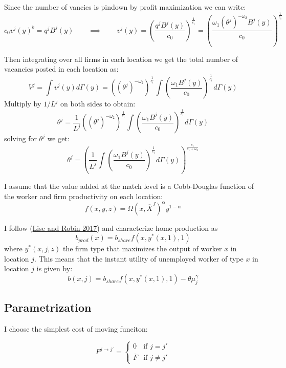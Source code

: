 \documentclass[
  letterpaper,
  DIV=11,
  numbers=noendperiod]{scrreprt}
\begin{document}
Since the number of vancies is pindown by profit maximization we can
write:
\[c_0 v^{j}(y)^{b} = q^j B^j(y) \qquad \implies \qquad  v^{j}(y) = \left(\frac{q^j B^j(y)}{c_0}\right)^{\frac{1}{c_1}} = \left(\frac{\omega_1(\theta^j)^{-\omega_2} B^j(y)}{c_0}\right)^{\frac{1}{c_1}} \]

Then integrating over all firms in each location we get the total number
of vacancies posted in each location as:
\[V^j = \int v^j(y)d\Gamma(y) = \left((\theta^j)^{-\omega_2}\right)^{\frac{1}{c_1}}\int\left(\frac{\omega_1 B^j(y)}{c_0}\right)^{\frac{1}{c_1}}d\Gamma(y)\]
Multiply by \(1/L^j\) on both sides to obtain:
\[\theta^j = \frac{1}{L^j}\left((\theta^j)^{-\omega_2}\right)^{\frac{1}{c_1}}\int\left(\frac{\omega_1 B^j(y)}{c_0}\right)^{\frac{1}{c_1}}d\Gamma(y)\]
solving for \(\theta^j\) we get:
\[\theta^j = \left(\frac{1}{L^j}\int\left(\frac{\omega_1 B^j(y)}{c_0}\right)^{\frac{1}{c_1}}d\Gamma(y)\right)^{\frac{c_1}{c_1+\omega_2}}\]

I assume that the value added at the match level is a Cobb-Douglas
function of the worker and firm productivity on each location:
\[f(x,y,z) = \Omega\left(x, \overline{X}^J\right)^\alpha y^{1-\alpha}\]

I follow
(\protect\hyperlink{ref-liseMacrodynamicsSortingWorkers2017}{Lise and
Robin 2017}) and characterize home production as
\[b_{prod}(x) = b_{share} f(x,y^*(x,1),1)\] where \(y^*(x,j,z)\) the
firm type that maximizes the output of worker \(x\) in location \(j\).
This means that the instant utility of unemployed worker of type \(x\)
in location \(j\) is given by:
\[b(x,j) = b_{share} f(x,y^*(x,1),1) - \theta \mu_j^\gamma\]

\hypertarget{parametrization}{%
\subsection{Parametrization}\label{parametrization}}

I choose the simplest cost of moving funciton:

\begin{equation}
    \label{eq-cost-of-moving}
    F^{j\to  j'} = \begin{cases} 0 & \text{if } j = j' \\ \overline{F} & \text{if } j \neq j' \end{cases}
\end{equation}
\end{document}
